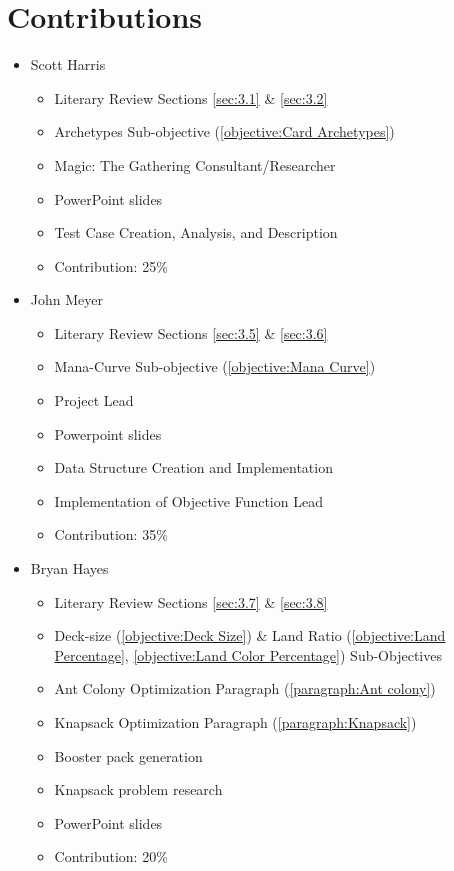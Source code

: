 \documentclass[12pt, letterpaper]{article}
\begin{document}
\section{Contributions}

\begin{itemize}

\item Scott Harris

\begin{itemize}

    \item Literary Review Sections \ref{sec:3.1} \& \ref{sec:3.2}
    \item Archetypes Sub-objective (\ref{objective:Card Archetypes})
    \item Magic: The Gathering Consultant/Researcher
	\item PowerPoint slides
    \item Test Case Creation, Analysis, and Description
    \item Contribution: 25\%

\end{itemize}

\item John Meyer

\begin{itemize}

    \item Literary Review Sections \ref{sec:3.5} \& \ref{sec:3.6}
    \item Mana-Curve Sub-objective (\ref{objective:Mana Curve})
    \item Project Lead
	\item Powerpoint slides
    \item Data Structure Creation and Implementation
    \item Implementation of Objective Function Lead
    \item Contribution: 35\%

\end{itemize}

\item Bryan Hayes

\begin{itemize}

    \item Literary Review Sections \ref{sec:3.7} \& \ref{sec:3.8}
    \item Deck-size (\ref{objective:Deck Size}) \&
        Land Ratio (\ref{objective:Land Percentage}, \ref{objective:Land Color Percentage}) Sub-Objectives
    \item Ant Colony Optimization Paragraph (\ref{paragraph:Ant colony})
	\item Knapsack Optimization Paragraph (\ref{paragraph:Knapsack})
	\item Booster pack generation
	\item Knapsack problem research
	\item PowerPoint slides
    \item Contribution: 20\%


\end{itemize}
\end{itemize}
\end{document}
